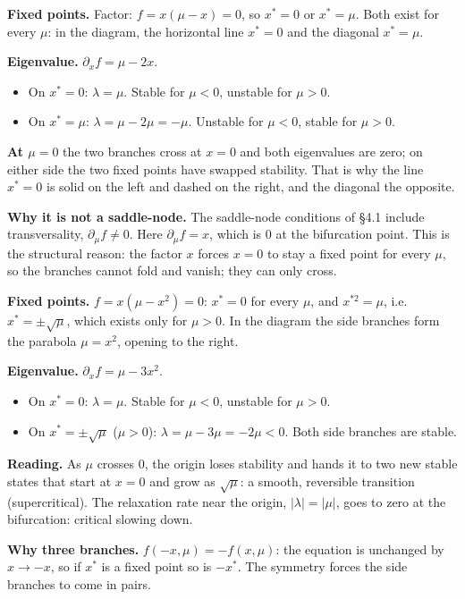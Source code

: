 \documentclass[11pt,openany]{report}
\begin{document}
\begin{worked}[(a) Transcritical: $\dot x = \mu x - x^2$]
\textbf{Fixed points.} Factor: $f = x(\mu - x) = 0$, so $x^* = 0$ or $x^* = \mu$. Both exist for every $\mu$: in the
diagram, the horizontal line $x^*=0$ and the diagonal $x^* = \mu$.

\textbf{Eigenvalue.} $\partial_x f = \mu - 2x$.
\begin{itemize}
\item On $x^* = 0$: $\lambda = \mu$. Stable for $\mu<0$, unstable for $\mu>0$.
\item On $x^* = \mu$: $\lambda = \mu - 2\mu = -\mu$. Unstable for $\mu<0$, stable for $\mu>0$.
\end{itemize}
\textbf{At $\mu = 0$} the two branches cross at $x=0$ and both eigenvalues are zero; on either side the two fixed points
have swapped stability. That is why the line $x^*=0$ is solid on the left and dashed on the right, and the diagonal the
opposite.

\textbf{Why it is not a saddle-node.} The saddle-node conditions of \S4.1 include transversality, $\partial_\mu f\ne0$.
Here $\partial_\mu f = x$, which is $0$ at the bifurcation point. This is the structural reason: the factor $x$ forces
$x=0$ to stay a fixed point for every $\mu$, so the branches cannot fold and vanish; they can only cross.
\end{worked}

\begin{worked}[(b) Supercritical pitchfork: $\dot x = \mu x - x^3$]
\textbf{Fixed points.} $f = x(\mu - x^2) = 0$: $x^* = 0$ for every $\mu$, and $x^{*2} = \mu$, i.e.\ $x^* = \pm\sqrt\mu$, which
exists only for $\mu>0$. In the diagram the side branches form the parabola $\mu = x^2$, opening to the right.

\textbf{Eigenvalue.} $\partial_x f = \mu - 3x^2$.
\begin{itemize}
\item On $x^* = 0$: $\lambda = \mu$. Stable for $\mu<0$, unstable for $\mu>0$.
\item On $x^* = \pm\sqrt\mu$ ($\mu>0$): $\lambda = \mu - 3\mu = -2\mu < 0$. Both side branches are stable.
\end{itemize}
\textbf{Reading.} As $\mu$ crosses 0, the origin loses stability and hands it to two new stable states that start at
$x=0$ and grow as $\sqrt\mu$: a smooth, reversible transition (supercritical). The relaxation rate near the origin,
$|\lambda| = |\mu|$, goes to zero at the bifurcation: critical slowing down.

\textbf{Why three branches.} $f(-x,\mu) = -f(x,\mu)$: the equation is unchanged by $x\to-x$, so if $x^*$ is a fixed point
so is $-x^*$. The symmetry forces the side branches to come in pairs.
\end{worked}
\end{document}
